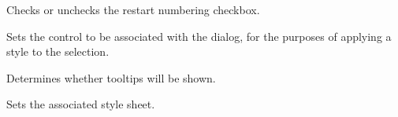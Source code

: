 Checks or unchecks the restart numbering checkbox.

\label{wxrichtextstyleorganiserdialogsetrichtextctrl}


Sets the control to be associated with the dialog, for the purposes of applying a style to the selection.

\label{wxrichtextstyleorganiserdialogsetshowtooltips}


Determines whether tooltips will be shown.

\label{wxrichtextstyleorganiserdialogsetstylesheet}


Sets the associated style sheet.

